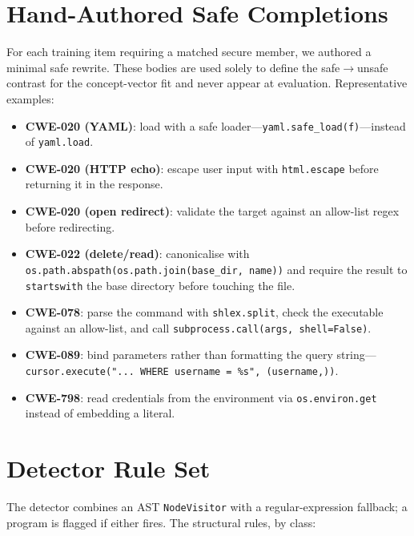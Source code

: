 \documentclass[11pt,a4paper]{article}
\begin{document}



\appendix

\section{Hand-Authored Safe Completions}
\label{app:safe}

For each training item requiring a matched secure member, we authored a minimal safe rewrite. These bodies are used solely to define the safe$\rightarrow$unsafe contrast for the concept-vector fit and never appear at evaluation. Representative examples:

\begin{itemize}
  \item \textbf{CWE-020 (YAML)}: load with a safe loader---\texttt{yaml.safe\_load(f)}---instead of \texttt{yaml.load}.
  \item \textbf{CWE-020 (HTTP echo)}: escape user input with \texttt{html.escape} before returning it in the response.
  \item \textbf{CWE-020 (open redirect)}: validate the target against an allow-list regex before redirecting.
  \item \textbf{CWE-022 (delete/read)}: canonicalise with \texttt{os.path.abspath(os.path.join(base\_dir, name))} and require the result to \texttt{startswith} the base directory before touching the file.
  \item \textbf{CWE-078}: parse the command with \texttt{shlex.split}, check the executable against an allow-list, and call \texttt{subprocess.call(args, shell=False)}.
  \item \textbf{CWE-089}: bind parameters rather than formatting the query string---\texttt{cursor.execute("... WHERE username = \%s", (username,))}.
  \item \textbf{CWE-798}: read credentials from the environment via \texttt{os.environ.get} instead of embedding a literal.
\end{itemize}

\section{Detector Rule Set}
\label{app:detector}

The detector combines an AST \texttt{NodeVisitor} with a regular-expression fallback; a program is flagged if either fires. The structural rules, by class:
\end{document}
